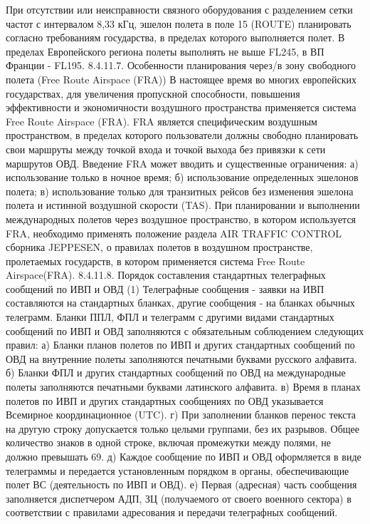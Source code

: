 При отсутствии или неисправности связного оборудования с разделением сетки частот с интервалом 8,33 кГц, эшелон полета в поле 15 (ROUTE) планировать согласно требованиям государства, в пределах которого выполняется полет. В пределах Европейского региона полеты выполнять не выше FL245, в ВП Франции - FL195.
8.4.11.7. Особенности планирования через/в зону свободного полета (Free Route Airspace (FRA)) 
В настоящее время во многих европейских государствах, для увеличения пропускной способности, повышения эффективности и экономичности воздушного пространства применяется система Free Route Airspace (FRA). 
FRA является специфическим воздушным пространством, в пределах которого пользователи должны свободно планировать свои маршруты между точкой входа и точкой выхода без привязки к сети маршрутов ОВД. 
Введение FRA может вводить и существенные ограничения: 
а)	использование только в ночное время; 
б)	использование определенных эшелонов полета; 
в)	использование только для транзитных рейсов без изменения эшелона полета и истинной воздушной скорости (TAS). 
При планировании и выполнении международных полетов через воздушное пространство, в котором используется FRA, необходимо применять положение раздела AIR TRAFFIC CONTROL сборника JEPPESEN, о правилах полетов в воздушном пространстве, пролетаемых государств, в котором применяется система Free Route Airspace(FRA).
8.4.11.8. Порядок составления стандартных телеграфных сообщений по ИВП и ОВД
(1) Телеграфные сообщения - заявки на ИВП составляются на стандартных бланках, другие сообщения - на бланках обычных телеграмм.
Бланки ППЛ, ФПЛ и телеграмм с другими видами стандартных сообщений по ИВП и ОВД заполняются с обязательным соблюдением следующих правил:
а)	Бланки планов полетов по ИВП и других стандартных сообщений по ОВД на внутренние полеты заполняются печатными буквами русского алфавита.
б)	Бланки ФПЛ и других стандартных сообщений по ОВД на международные полеты заполняются печатными буквами латинского алфавита.
в)	Время в планах полетов по ИВП и других стандартных сообщениях по ОВД указывается Всемирное координационное (UTC).
г)	При заполнении бланков перенос текста на другую строку допускается только целыми группами, без их разрывов. Общее количество знаков в одной строке, включая промежутки между полями, не должно превышать 69.
д)	Каждое сообщение по ИВП и ОВД оформляется в виде телеграммы и передается установленным порядком в органы, обеспечивающие полет ВС (деятельность по ИВП и ОВД).
е)	Первая (адресная) часть сообщения заполняется диспетчером АДП, ЗЦ (получаемого от своего военного сектора) в соответствии с правилами адресования и передачи телеграфных сообщений.
